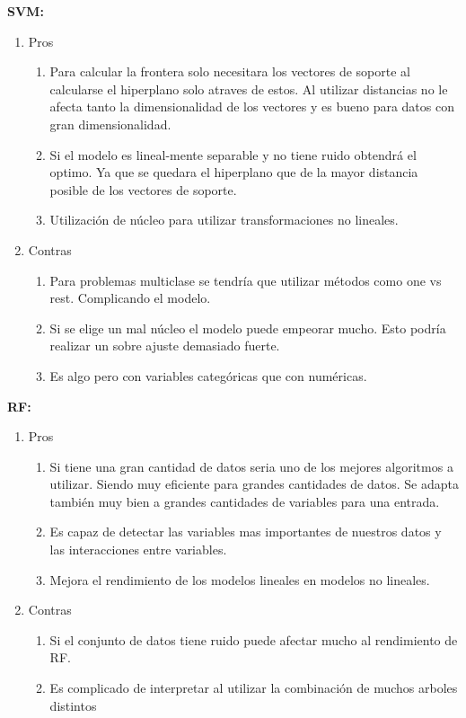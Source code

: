 \documentclass[titlepage]{article}
\begin{document}
\textbf{SVM:}
\begin{enumerate}
	\item Pros
	\begin{enumerate}
		\item Para calcular la frontera solo necesitara los vectores de soporte al calcularse el hiperplano solo atraves de estos. Al utilizar distancias no le afecta tanto la dimensionalidad de los vectores y es bueno para datos con gran dimensionalidad.
		\item Si el modelo es lineal-mente separable y no tiene ruido obtendrá el optimo. Ya que se quedara el hiperplano que de la mayor distancia posible de los vectores de soporte.
		\item Utilización de núcleo para utilizar transformaciones no lineales.
	\end{enumerate}
	\item Contras
	\begin{enumerate}
		\item Para problemas multiclase se tendría que utilizar métodos como one vs rest. Complicando el modelo. 
		\item Si se elige un mal núcleo el modelo puede empeorar mucho. Esto podría realizar un sobre ajuste demasiado fuerte.
		\item Es algo pero con variables categóricas que con numéricas.
		
	\end{enumerate}
\end{enumerate}

\textbf{RF:}
\begin{enumerate}
	\item Pros
	\begin{enumerate}
		\item Si tiene una gran cantidad de datos seria uno de los mejores algoritmos a utilizar. Siendo muy eficiente para grandes cantidades de datos. Se adapta también muy bien a grandes cantidades de variables para una entrada.
		
		\item Es capaz de detectar las variables mas importantes de nuestros datos y las interacciones entre variables. 
		
		\item Mejora el rendimiento de los modelos lineales en modelos no lineales.
		
		
	\end{enumerate}
	\item Contras
	\begin{enumerate}
		\item Si el conjunto de datos tiene ruido puede afectar mucho al rendimiento de RF.
		\item Es complicado de interpretar al utilizar la combinación de muchos arboles distintos
	\end{enumerate}
\end{enumerate}
\end{document}

